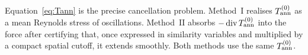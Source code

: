 Equation~\eqref{eq:Tann} is the precise cancellation problem. Method~I realises $T^{(0)}_{\mathrm{ann}}$ as a mean {R}eynolds stress of oscillations. Method~II absorbs $-\operatorname{div} T^{(0)}_{\mathrm{ann}}$ into the force after certifying that, once expressed in similarity variables and multiplied by a compact spatial cutoff, it extends smoothly. Both methods use the same $T^{(0)}_{\mathrm{ann}}$.
